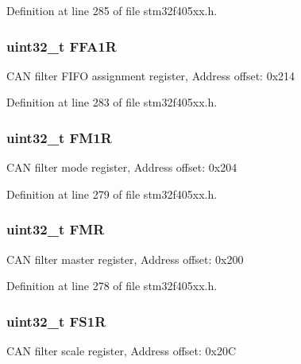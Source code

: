 Definition at line 285 of file stm32f405xx.\+h.

\subsubsection[{\texorpdfstring{F\+F\+A1R}{FFA1R}}]{ uint32\+\_\+t F\+F\+A1R}\hypertarget{struct_c_a_n___type_def_af1405e594e39e5b34f9499f680157a25}{}\label{struct_c_a_n___type_def_af1405e594e39e5b34f9499f680157a25}
C\+AN filter F\+I\+FO assignment register, Address offset\+: 0x214 

Definition at line 283 of file stm32f405xx.\+h.

\subsubsection[{\texorpdfstring{F\+M1R}{FM1R}}]{ uint32\+\_\+t F\+M1R}\hypertarget{struct_c_a_n___type_def_aaa6f4cf1f16aaa6d17ec6c410db76acf}{}\label{struct_c_a_n___type_def_aaa6f4cf1f16aaa6d17ec6c410db76acf}
C\+AN filter mode register, Address offset\+: 0x204 

Definition at line 279 of file stm32f405xx.\+h.

\subsubsection[{\texorpdfstring{F\+MR}{FMR}}]{ uint32\+\_\+t F\+MR}\hypertarget{struct_c_a_n___type_def_a1cb734df34f6520a7204c4c70634ebba}{}\label{struct_c_a_n___type_def_a1cb734df34f6520a7204c4c70634ebba}
C\+AN filter master register, Address offset\+: 0x200 

Definition at line 278 of file stm32f405xx.\+h.

\subsubsection[{\texorpdfstring{F\+S1R}{FS1R}}]{ uint32\+\_\+t F\+S1R}\hypertarget{struct_c_a_n___type_def_aae0256ae42106ee7f87fc7e5bdb779d4}{}\label{struct_c_a_n___type_def_aae0256ae42106ee7f87fc7e5bdb779d4}
C\+AN filter scale register, Address offset\+: 0x20C 

